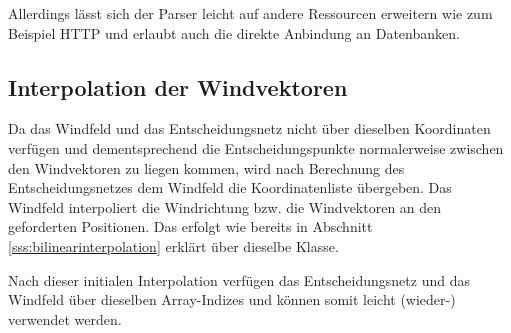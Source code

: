 Allerdings lässt sich der Parser leicht auf andere Ressourcen erweitern wie zum
Beispiel HTTP und erlaubt auch die direkte Anbindung an Datenbanken.

\subsection{Interpolation der Windvektoren}
Da das Windfeld und das Entscheidungsnetz nicht über dieselben Koordinaten
verfügen und dementsprechend die Entscheidungspunkte normalerweise zwischen den
Windvektoren zu liegen kommen, wird nach Berechnung des Entscheidungsnetzes dem
Windfeld die Koordinatenliste übergeben. Das Windfeld interpoliert die
Windrichtung bzw. die Windvektoren an den geforderten Positionen. Das erfolgt
wie bereits in Abschnitt \ref{sss:bilinearinterpolation} erklärt über dieselbe
Klasse.

Nach dieser initialen Interpolation verfügen das Entscheidungsnetz und das
Windfeld über dieselben Array-Indizes und können somit leicht (wieder-)
verwendet werden.
